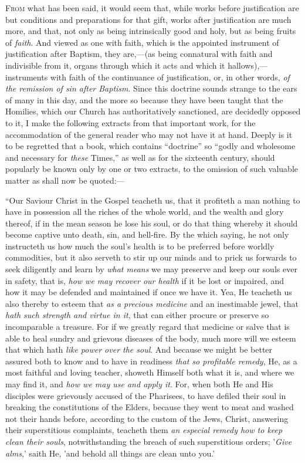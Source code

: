 F\textsc{rom} what has been said, it would seem that, while works
before justification are but conditions and preparations for that
gift, works after justification are much
more, and that, not only as being intrinsically good and holy, but as
being fruits of \emph{faith}. And viewed as one with faith, which is
the appointed instrument of justification after Baptism, they are,—(as
being connatural with faith and indivisible from it, organs through
which it acts and which it hallows),—instruments with faith of the
continuance of justification, or, in other words, \emph{of the remission
of sin after Baptism}. Since this doctrine sounds strange to the
ears of many in this day, and the more so because they have been
taught that the Homilies, which our Church has authoritatively
sanctioned, are decidedly opposed to it, I make the following extracts
from that important work, for the accommodation of the general reader
who may not have it at hand. Deeply is it to be regretted that a book,
which contains ``doctrine'' so ``godly and wholesome and
necessary for \emph{these} Times,'' as well as for the sixteenth
century, should popularly be known only by one or two extracts, to the
omission of such valuable matter as shall now be quoted:—

``Our Saviour Christ in the Gospel teacheth us,
that it profiteth a man nothing to have in possession all the riches
of the whole world, and the wealth and glory thereof, if in the mean
season he lose his soul, or do that thing whereby it should become
captive unto death, sin, and hell-fire. By the which saying, he not
only instructeth us how much the soul's health is to be preferred
before worldly commodities, but it also serveth to stir up our minds
and to prick us forwards to seek diligently and learn by \emph{what means}
we may preserve and keep our souls ever in safety, that is, \emph{how
we may recover our health} if it be lost or impaired, and how it
may be defended and maintained if once we have it. Yea, He teacheth us
also thereby to esteem that \emph{as a precious medicine} and an
inestimable jewel, that \emph{hath such strength and virtue in it},
that can either procure or preserve so incomparable a treasure. For if
we greatly regard that medicine or salve that is able to heal sundry
and grievous diseases of the body, much more will we esteem that which
hath \emph{like power over the soul}. And because we might be better
assured both to know and to have in readiness \emph{that so profitable
remedy}, He, as a most faithful and loving teacher, showeth Himself
both what it is, and where we may find it, and \emph{how we may use and
apply it}. For, when both He and His disciples were grievously
accused of the Pharisees, to have defiled their soul in breaking the
constitutions of the Elders, because they went to meat and washed not
their hands before, according to the custom of the Jews, Christ,
answering their superstitious complaints, teacheth them \emph{an especial
remedy how to keep clean their souls}, notwithstanding the breach
of such superstitious orders; '\emph{Give alms},' saith He, 'and
behold all things are clean unto you.'

